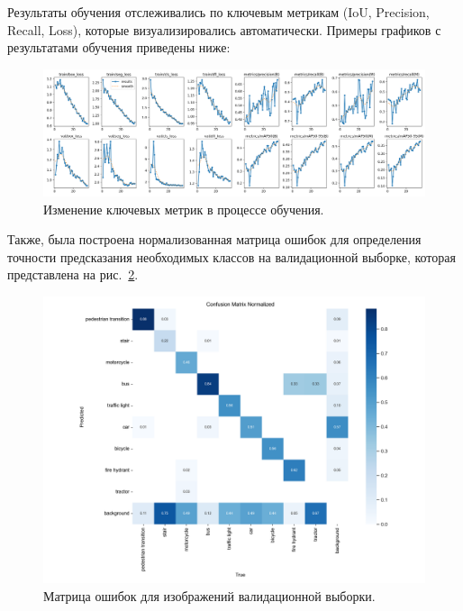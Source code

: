 Результаты обучения отслеживались по ключевым метрикам (IoU, Precision, Recall, 
Loss), которые визуализировались автоматически. Примеры графиков с результатами 
обучения приведены ниже:

\begin{figure}[H]
    \centering
    \includegraphics[width=1\linewidth]{imgs/imagecaptcha/results.png}
    \caption{Изменение ключевых метрик в процессе обучения.}
    \label{fig:metrics}
\end{figure}
\vspace{-0.5cm}

Также, была построена нормализованная матрица ошибок для определения точности 
предсказания необходимых классов на валидационной выборке, которая представлена 
на рис.~\ref{fig:confusion}.

\begin{figure}[H]
    \centering
    \includegraphics[width=1\linewidth]{
        imgs/imagecaptcha/confusion_matrix_normalized.png
    }
    \caption{Матрица ошибок для изображений валидационной выборки.}
    \label{fig:confusion}
\end{figure}
\vspace{-0.5cm}